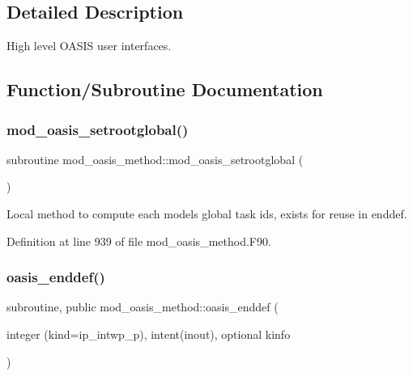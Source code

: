 \subsection{Detailed Description}
High level O\+A\+S\+IS user interfaces. 

\subsection{Function/\+Subroutine Documentation}
\mbox{\label{namespacemod__oasis__method_a13d6e469ea14642a2e1e6cb807d9b7de}} 
\subsubsection{\texorpdfstring{mod\+\_\+oasis\+\_\+setrootglobal()}{mod\_oasis\_setrootglobal()}}
{\footnotesize\ttfamily subroutine mod\+\_\+oasis\+\_\+method\+::mod\+\_\+oasis\+\_\+setrootglobal (\begin{DoxyParamCaption}{ }\end{DoxyParamCaption})\hspace{0.3cm}{\ttfamily [private]}}



Local method to compute each models\textquotesingle{} global task ids, exists for reuse in enddef. 



Definition at line 939 of file mod\+\_\+oasis\+\_\+method.\+F90.

\mbox{\label{namespacemod__oasis__method_a093552f9f9895ac79a5fefa043fc5881}} 
\subsubsection{\texorpdfstring{oasis\+\_\+enddef()}{oasis\_enddef()}}
{\footnotesize\ttfamily subroutine, public mod\+\_\+oasis\+\_\+method\+::oasis\+\_\+enddef (\begin{DoxyParamCaption}\item[{integer (kind=ip\+\_\+intwp\+\_\+p), intent(inout), optional}]{kinfo }\end{DoxyParamCaption})}



